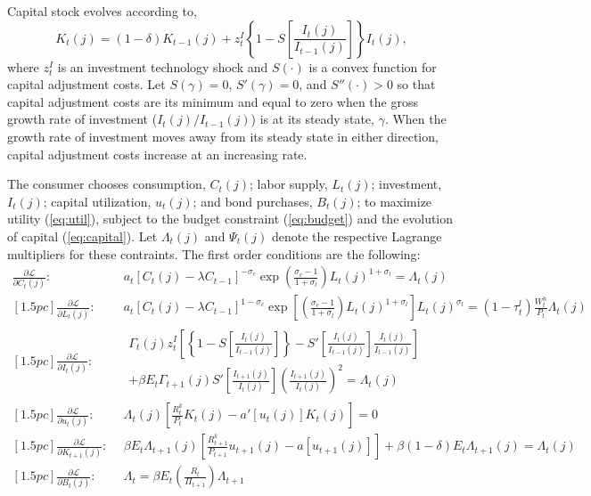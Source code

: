 \documentclass[11pt]{article}
\newcommand{\beq}{\begin{equation}}
\newcommand{\eeq}{\end{equation}}
\newcommand{\ds}{\displaystyle}
\newcommand{\eqref}[1]{(\ref{#1})}
\newcommand{\La}{\mathcal{L}}
\begin{document}
Capital stock evolves according to,
\beq \label{eq:capital} K_t(j) = (1-\delta) K_{t-1}(j) + z_t^I\left\{1 - S\left[\frac{I_t(j)}{I_{t-1}(j)}\right]\right\}I_t(j), \eeq
where $z_t^I$ is an investment technology shock and $S(\cdot)$ is a convex function for capital adjustment costs.  Let $S(\gamma)=0$, $S'(\gamma)=0$, and $S''(\cdot)>0$ so that capital adjustment costs are its minimum and equal to zero when the gross growth rate of investment ($I_t(j)/I_{t-1}(j)$) is at its steady state, $\gamma$.  When the growth rate of investment moves away from its steady state in either direction, capital adjustment costs increase at an increasing rate.

The consumer chooses consumption, $C_t(j)$; labor supply, $L_t(j)$; investment, $I_t(j)$; capital utilization, $u_t(j)$; and bond purchases, $B_t(j)$; to maximize utility \eqref{eq:util}, subject to the budget constraint \eqref{eq:budget} and the evolution of capital \eqref{eq:capital}.  Let $\Lambda_t(j)$ and $\Psi_t(j)$ denote the respective Lagrange multipliers for these contraints.   The first order conditions are the following:
\begin{eqnarray} 
\label{eq:focc} \ds \frac{\partial \La}{\partial C_t(j)}:~~ &  a_t \left[C_t(j) - \lambda C_{t-1}\right]^{-\sigma_c} \exp{\left(\frac{\ds \sigma_c-1}{\ds 1+\sigma_l}\right) L_t(j)^{1+\sigma_l}} = \Lambda_t(j) \\ [1.5pc]
\label{eq:focl} \ds \frac{\partial \La}{\partial L_t(j)}:~~ &  a_t \left[C_t(j) - \lambda C_{t-1}\right]^{1-\sigma_c} \exp{\left[\left(\frac{\ds \sigma_c-1}{\ds 1+\sigma_l}\right) L_t(j)^{1+\sigma_l}\right] } L_t(j)^{\sigma_l} = (1-\tau_t^l) \frac{\ds W_t^h}{\ds P_t} \Lambda_t(j) \\ [1.5pc]
\label{eq:foci} \ds \frac{\partial \La}{\partial I_t(j)}:~~ & \begin{array}{r} \Gamma_t(j) z_t^I \left[ \left\{ 1 - S\left[\frac{\ds I_t(j)}{\ds I_{t-1}(j)}\right]\right\} - S'\left[\frac{\ds I_t(j)}{\ds I_{t-1}(j)}\right] \frac{\ds I_t(j)}{\ds I_{t-1}(j)} \right] \\ [1.5pc] 
+ \beta E_t \Gamma_{t+1} (j)S'\left[\frac{\ds I_{t+1}(j)}{\ds I_{t}(j)}\right] \left( \frac{\ds I_{t+1}(j)}{\ds I_{t}(j)} \right)^2 = \Lambda_t(j) \end{array} \\ [1.5pc]
\label{eq:focu} \ds \frac{\partial \La}{\partial u_{t}(j)}:~~ & \Lambda_t(j) \left[ \frac{\ds R_t^k}{\ds P_t} K_t(j) - a'[u_t(j)]K_t(j)\right] = 0 \\ [1.5pc]
\label{eq:fock} \ds \frac{\partial \La}{\partial K_{t+1}(j)}:~~ & \beta E_t \Lambda_{t+1}(j) \left[\frac{\ds R_{t+1}^k}{\ds P_{t+1}} u_{t+1}(j) - a\left[u_{t+1}(j)\right] \right] + \beta (1-\delta) E_t \Lambda_{t+1}(j) = \Lambda_t(j) \\ [1.5pc]
\label{eq:focb} \ds \frac{\partial \La}{\partial B_t(j)}:~~ & \Lambda_t = \beta E_t \left(\frac{\ds R_t}{\ds \Pi_{t+1}}\right) \Lambda_{t+1} 
\end{eqnarray}
\end{document}
